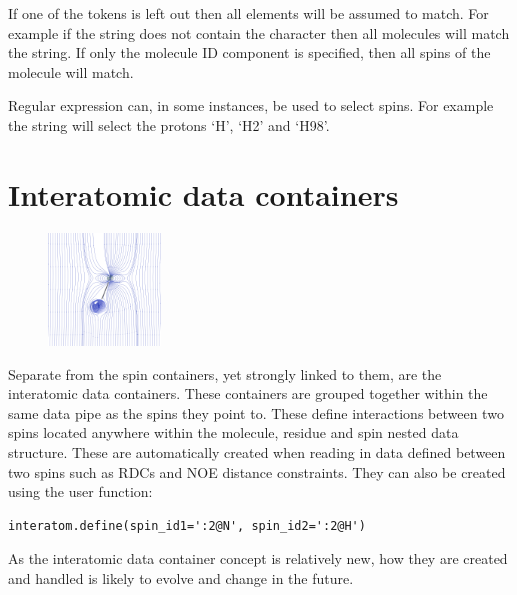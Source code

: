 If one of the tokens is left out then all elements will be assumed to match.
For example if the string does not contain the \promptstring{\#} character then all molecules will match the string.
If only the molecule ID component is specified, then all spins of the molecule will match.

Regular expression can, in some instances, be used to select spins.
For example the string  will select the protons `H', `H2' and `H98'.




\section{Interatomic data containers} \label{sect: interatomic container}

\begin{figure}[h]
  \includegraphics[width=3cm, bb=0 0 1701 1701]{graphics/wizards/dipole_pair/NH_dipole_pair_600x600}
\end{figure}

Separate from the spin containers, yet strongly linked to them, are the interatomic data containers.
These containers are grouped together within the same data pipe as the spins they point to.
These define interactions between two spins located anywhere within the molecule, residue and spin nested data structure.
These are automatically created when reading in data defined between two spins such as RDCs and NOE distance constraints.
They can also be created using the  user function:

\begin{lstlisting}
interatom.define(spin_id1=':2@N', spin_id2=':2@H')
\end{lstlisting}

As the interatomic data container concept is relatively new, how they are created and handled is likely to evolve and change in the future.




